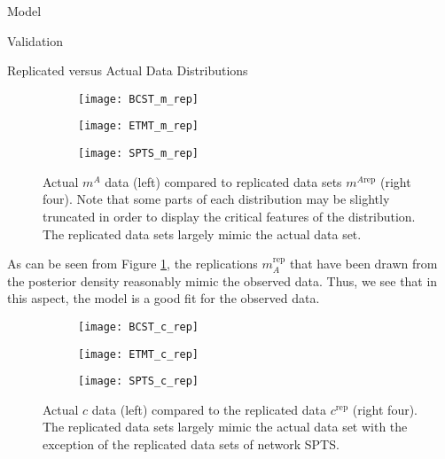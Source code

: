 \begin{chapter}{Model}
\begin{section}{Validation}
\begin{subsection}{Replicated versus Actual Data Distributions}
    \begin{figure}[!h]
      \begin{subfigure}[b]{.75\textwidth}
        \centering
        \texttt{[image: BCST\_m\_rep]}
      \end{subfigure}
      \begin{subfigure}[b]{.75\textwidth}
        \centering
        \texttt{[image: ETMT\_m\_rep]}
      \end{subfigure}
      \begin{subfigure}[b]{.75\textwidth}
        \centering
        \texttt{[image: SPTS\_m\_rep]}
      \end{subfigure}
      \caption{Actual $m^A$ data (left) compared to replicated data sets $m^{A\text{rep}}$ (right four). Note that
        some parts of each distribution may be slightly truncated in order to display the critical features of the distribution.
        The replicated data sets largely mimic the actual data set.}
      \label{fig:m_rep}
    \end{figure}

    As can be seen from Figure \ref{fig:m_rep}, the replications $m_A^\text{rep}$ that have been drawn
    from the posterior density reasonably mimic the observed data. Thus, we see that in
    this aspect, the model is a good fit for the observed data.

    \begin{figure}[!h]
      \begin{subfigure}[b]{.75\textwidth}
        \centering
        \texttt{[image: BCST\_c\_rep]}
      \end{subfigure}
      \begin{subfigure}[b]{.75\textwidth}
        \centering
        \texttt{[image: ETMT\_c\_rep]}
      \end{subfigure}
      \begin{subfigure}[b]{.75\textwidth}
        \centering
        \texttt{[image: SPTS\_c\_rep]}
      \end{subfigure}
      \caption{Actual $c$ data (left) compared to the replicated data $c^{\text{rep}}$ (right four). The replicated
        data sets largely mimic the actual data set with the exception of the replicated data sets of network SPTS.}
      \label{fig:c_rep}
    \end{figure}


\end{subsection}
\end{section}
\end{chapter}
